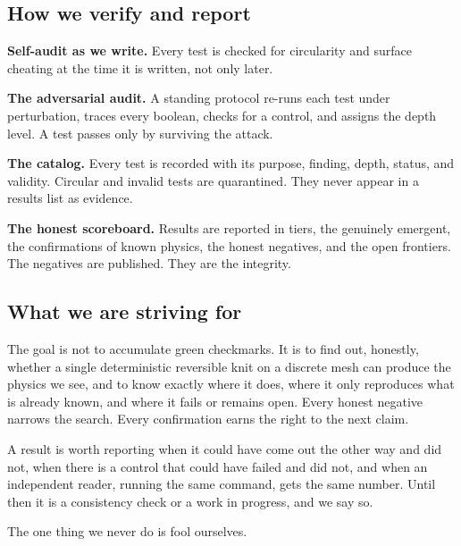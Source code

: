 \subsection{How we verify and report}

\textbf{Self-audit as we write.} Every test is checked for circularity and surface cheating at the time it is written, not only later.

\textbf{The adversarial audit.} A standing protocol re-runs each test under perturbation, traces every boolean, checks for a control, and assigns the depth level. A test passes only by surviving the attack.

\textbf{The catalog.} Every test is recorded with its purpose, finding, depth, status, and validity. Circular and invalid tests are quarantined. They never appear in a results list as evidence.

\textbf{The honest scoreboard.} Results are reported in tiers, the genuinely emergent, the confirmations of known physics, the honest negatives, and the open frontiers. The negatives are published. They are the integrity.

\subsection{What we are striving for}

The goal is not to accumulate green checkmarks. It is to find out, honestly, whether a single deterministic reversible knit on a discrete mesh can produce the physics we see, and to know exactly where it does, where it only reproduces what is already known, and where it fails or remains open. Every honest negative narrows the search. Every confirmation earns the right to the next claim.

\begin{principle}
A result is worth reporting when it could have come out the other way and did not, when there is a control that could have failed and did not, and when an independent reader, running the same command, gets the same number. Until then it is a consistency check or a work in progress, and we say so.
\end{principle}

The one thing we never do is fool ourselves.
